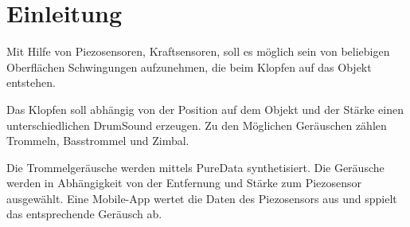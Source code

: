 \section*{Einleitung}
Mit Hilfe von Piezosensoren, Kraftsensoren, soll es möglich sein von beliebigen Oberflächen Schwingungen aufzunehmen, die beim Klopfen auf das Objekt entstehen.

Das Klopfen soll abhängig von der Position auf dem Objekt und der Stärke einen unterschiedlichen DrumSound erzeugen. 
Zu den Möglichen Geräuschen zählen Trommeln, Basstrommel und Zimbal.

Die Trommelgeräusche werden mittels PureData synthetisiert. 
Die Geräusche werden in Abhängigkeit von der Entfernung und Stärke zum Piezosensor ausgewählt.
Eine Mobile-App wertet die Daten des Piezosensors aus und sppielt das entsprechende Geräusch ab.

